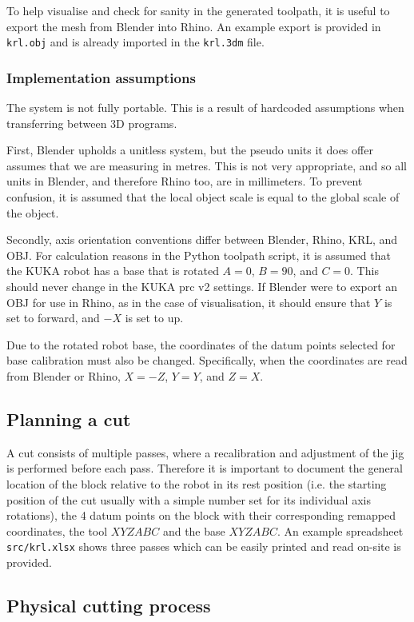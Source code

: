 To help visualise and check for sanity in the generated toolpath, it is useful to export the mesh from Blender into Rhino. An example export is provided in {\tt krl.obj} and is already imported in the {\tt krl.3dm} file.

\subsubsection{Implementation assumptions}

The system is not fully portable. This is a result of hardcoded assumptions when transferring between 3D programs.

First, Blender upholds a unitless system, but the pseudo units it does offer assumes that we are measuring in metres. This is not very appropriate, and so all units in Blender, and therefore Rhino too, are in millimeters. To prevent confusion, it is assumed that the local object scale is equal to the global scale of the object.

Secondly, axis orientation conventions differ between Blender, Rhino, KRL, and OBJ. For calculation reasons in the Python toolpath script, it is assumed that the KUKA robot has a base that is rotated $A = 0$, $B = 90$, and $C =  0$. This should never change in the KUKA prc v2 settings. If Blender were to export an OBJ for use in Rhino, as in the case of visualisation, it should ensure that $Y$ is set to forward, and $-X$ is set to up.

Due to the rotated robot base, the coordinates of the datum points selected for base calibration must also be changed. Specifically, when the coordinates are read from Blender or Rhino, $X = -Z$, $Y = Y$, and $Z = X$.

\subsection{Planning a cut}

A cut consists of multiple passes, where a recalibration and adjustment of the jig is performed before each pass. Therefore it is important to document the general location of the block relative to the robot in its rest position (i.e. the starting position of the cut usually with a simple number set for its individual axis rotations), the 4 datum points on the block with their corresponding remapped coordinates, the tool $XYZABC$ and the base $XYZABC$. An example spreadsheet {\tt src/krl.xlsx} shows three passes which can be easily printed and read on-site is provided.

\subsection{Physical cutting process}
